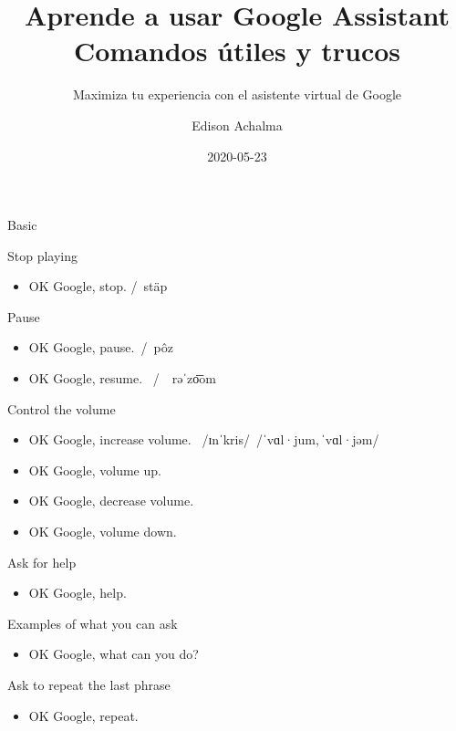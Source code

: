 \documentclass[
  letterpaper,
  DIV=11,
  numbers=noendperiod]{scrartcl}
\title{Aprende a usar Google Assistant Comandos útiles y trucos}
\subtitle{Maximiza tu experiencia con el asistente virtual de Google}
\author{Edison Achalma}
\date{2020-05-23}
\providecommand{\tightlist}{%
  \setlength{\itemsep}{0pt}\setlength{\parskip}{0pt}}\usepackage{longtable,booktabs,array}
\begin{document}
\maketitle
\ifdefined\Shaded\renewenvironment{Shaded}{\begin{tcolorbox}[enhanced, frame hidden, sharp corners, breakable, borderline west={3pt}{0pt}{shadecolor}, boxrule=0pt, interior hidden]}{\end{tcolorbox}}\fi

Basic

Stop playing

\begin{itemize}
\tightlist
\item
  OK Google, stop. /~stäp
\end{itemize}

Pause

\begin{itemize}
\tightlist
\item
  OK Google, pause.~/~pôz
\item
  OK Google, resume.~ /~~rəˈzo͞om
\end{itemize}

Control the volume

\begin{itemize}
\tightlist
\item
  OK Google, increase volume.~ /ɪnˈkris/ \,/ˈvɑl·jum,\,ˈvɑl·jəm/
\item
  OK Google, volume up.
\item
  OK Google, decrease volume.
\item
  OK Google, volume down.
\end{itemize}

Ask for help

\begin{itemize}
\tightlist
\item
  OK Google, help.
\end{itemize}

Examples of what you can ask

\begin{itemize}
\tightlist
\item
  OK Google, what can you do?
\end{itemize}

Ask to repeat the last phrase

\begin{itemize}
\tightlist
\item
  OK Google, repeat.
\end{itemize}
\end{document}
